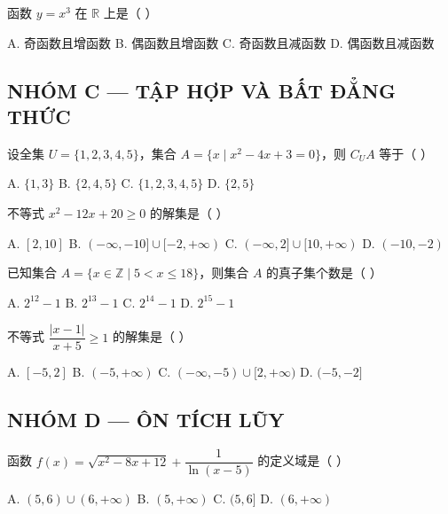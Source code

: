 \documentclass[11pt, a4paper]{article}
\begin{document}
\begin{baitap}[19]
函数 $y = x^3$ 在 $\mathbb{R}$ 上是（ ）
\par\vspace{3pt}
\noindent A. 奇函数且增函数 \quad B. 偶函数且增函数 \quad C. 奇函数且减函数 \quad D. 偶函数且减函数
\end{baitap}

\subsection*{NHÓM C — TẬP HỢP VÀ BẤT ĐẲNG THỨC}

\begin{baitap}[20]
设全集 $U=\{1,2,3,4,5\}$，集合 $A=\{x\mid x^2-4x+3=0\}$，则 $C_UA$ 等于（ ）
\par\vspace{3pt}
\noindent A. $\{1,3\}$ \quad B. $\{2,4,5\}$ \quad C. $\{1,2,3,4,5\}$ \quad D. $\{2,5\}$
\end{baitap}

\begin{baitap}[21]
不等式 $x^2 - 12x + 20 \ge 0$ 的解集是（ ）
\par\vspace{3pt}
\noindent A. $[2,10]$ \quad B. $(-\infty, -10] \cup [-2, +\infty)$ \quad C. $(-\infty, 2] \cup [10, +\infty)$ \quad D. $(-10, -2)$
\end{baitap}

\begin{baitap}[22]
已知集合 $A=\{x\in\mathbb Z\mid 5<x\le18\}$，则集合 $A$ 的真子集个数是（ ）
\par\vspace{3pt}
\noindent A. $2^{12}-1$ \quad B. $2^{13}-1$ \quad C. $2^{14}-1$ \quad D. $2^{15}-1$
\end{baitap}

\begin{baitap}[23]
不等式 $\dfrac{|x-1|}{x+5} \ge 1$ 的解集是（ ）
\par\vspace{3pt}
\noindent A. $[-5,2]$ \quad B. $(-5, +\infty)$ \quad C. $(-\infty, -5) \cup [2, +\infty)$ \quad D. $(-5, -2]$
\end{baitap}

\subsection*{NHÓM D — ÔN TÍCH LŨY}

\begin{baitap}[24]
函数 $f(x) = \sqrt{x^2 - 8x + 12} + \dfrac{1}{\ln(x-5)}$ 的定义域是（ ）
\par\vspace{3pt}
\noindent A. $(5,6) \cup (6, +\infty)$ \quad B. $(5, +\infty)$ \quad C. $(5,6]$ \quad D. $(6, +\infty)$
\end{baitap}
\end{document}
